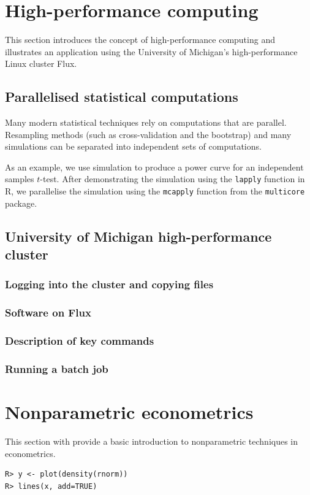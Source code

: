\section{High-performance computing}
This section introduces the concept of high-performance computing and illustrates an application using the University of Michigan's high-performance Linux cluster Flux.


\subsection{Parallelised statistical computations}
Many modern statistical techniques rely on computations that are parallel. Resampling methods (such as cross-validation and the bootstrap) and many simulations can be separated into independent sets of computations. 

As an example, we use simulation to produce a power curve for an independent samples $t$-test. After demonstrating the simulation using the \texttt{lapply} function in \textsf{R}, we parallelise the simulation using the \texttt{mcapply} function from the \texttt{multicore} package.



\subsection{University of Michigan high-performance cluster}
\subsubsection{Logging into the cluster and copying files}
\subsubsection{Software on Flux}
\subsubsection{Description of key commands}
\subsubsection{Running a batch job}

\section{Nonparametric econometrics}
This section with provide a basic introduction to nonparametric techniques in econometrics.

\linenumbers
\footnotesize
\begin{verbatim}
R> y <- plot(density(rnorm))
R> lines(x, add=TRUE)
\end{verbatim}
\normalsize
\nolinenumbers
